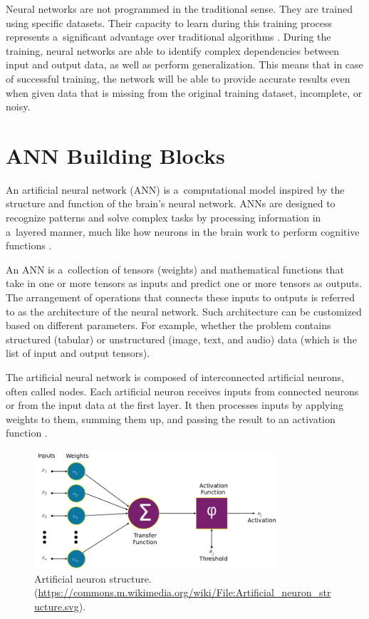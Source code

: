 Neural networks are not programmed in the traditional sense. They are trained using specific datasets. Their capacity to learn during this training process represents a~significant advantage over traditional algorithms \cite{ayyadevara2024modern}. During the training, neural networks are able to identify complex dependencies between input and output data, as well as perform generalization. This means that in case of successful training, the network will be able to provide accurate results even when given data that is missing from the original training dataset, incomplete, or noisy.

\section{ANN Building Blocks}

An artificial neural network (ANN) is a~computational model inspired by the structure and function of the brain's neural network. ANNs are designed to recognize patterns and solve complex tasks by processing information in a~layered manner, much like how neurons in the brain work to perform cognitive functions \cite{lecun2023when}.

An ANN is a~collection of tensors (weights) and mathematical functions that take in one or more tensors as inputs and predict one or more tensors as outputs. The arrangement of operations that connects these inputs to outputs is referred to as the architecture of the neural network. Such architecture can be customized based on different parameters. For example, whether the problem contains structured (tabular) or unstructured (image, text, and audio) data (which is the list of input and output tensors).

The artificial neural network is composed of interconnected artificial neurons, often called nodes. Each artificial neuron receives inputs from connected neurons or from the input data at the first layer. It then processes inputs by applying weights to them, summing them up, and passing the result to an activation function \cite{lecun2023when}.

\begin{figure}[htbp]
    \centering
    \includegraphics[width=0.8\textwidth]{obrazky-figures/02-theoretical-basis/Artificial_neuron_structure.png}
    \caption{Artificial neuron structure. (\url{https://commons.m.wikimedia.org/wiki/File:Artificial_neuron_structure.svg}).}
    \label{fig:neuron}
\end{figure}

